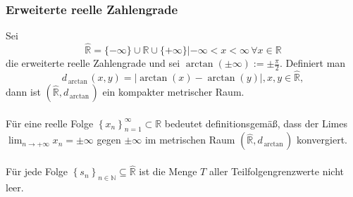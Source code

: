\documentclass[a4paper,12pt]{article}
\begin{document}
\subsubsection{Erweiterte reelle Zahlengrade}
Sei 
\[ 
        \hat{\mathbb{R}}=\{-\infty\}\cup \mathbb{R}\cup \{+\infty\}|-\infty<x<\infty\,\forall x \in \mathbb{R}
\] 
die erweiterte reelle Zahlengrade und sei $\arctan(\pm \infty):=\pm \tfrac{\pi }{2}$. Definiert man 
\[ 
        d_{\,\text{arctan}\,}(x,y)=|\arctan(x)-\arctan(y)|,x,y \in \hat{\mathbb{R}}
,\] dann ist $\left(\hat{\mathbb{R}},d_{\,\text{arctan}\,}\right)$ ein kompakter metrischer Raum.\\\\
Für eine reelle Folge $\left\{x_n\right\}_{n=1}^\infty\subset \mathbb{R}$ bedeutet definitionsgemäß, dass der Limes $\lim_{n\rightarrow +\infty}x_n=\pm\infty$ gegen $\pm\infty$ im metrischen Raum $\left(\hat{\mathbb{R}},d_{\,\text{arctan}\,}\right)$ konvergiert.\\\\
Für jede Folge $\left\{s_n\right\}_{n  \in \mathbb{N}}\subseteq \hat{\mathbb{R}}$ ist die Menge $T$ aller Teilfolgengrenzwerte nicht leer.
\end{document}

